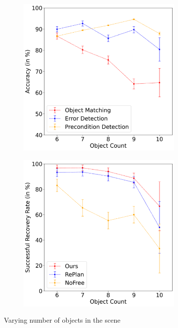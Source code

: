 \begin{figure}
    \begin{subfigure}{0.5\hsize}
       \centering    \includegraphics[width=0.9\textwidth]{assets/vary-obj-1.png}
    \end{subfigure}
    \begin{subfigure}{0.5\hsize}
       \centering    \includegraphics[width=0.9\textwidth]{assets/vary-obj-2.png}
    \end{subfigure}
    \caption{
        Varying number of objects in the scene
    }
    \label{fig:graphs-obj}
\end{figure}

